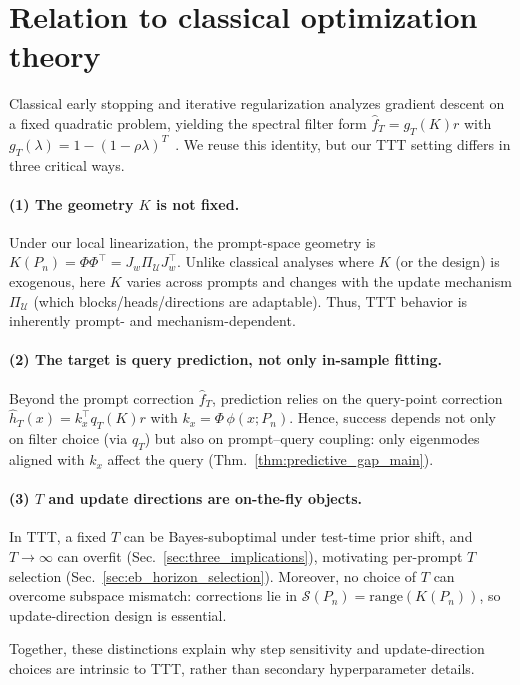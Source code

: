 \documentclass{article}
\theoremstyle{plain}
\theoremstyle{definition}
\theoremstyle{remark}
\begin{document}
\section{Relation to classical optimization theory}
\label{app:early_stopping_relation}
Classical early stopping and iterative regularization analyzes gradient descent on a fixed quadratic problem, yielding the spectral filter form $\hat f_T=g_T(K)r$ with $g_T(\lambda)=1-(1-\rho\lambda)^T$~\citet[e.g.,][]{YaoRosascoCaponnetto2007EarlyStopping,engl1996regularization}. We reuse this identity, but our TTT setting differs in three critical ways.

\paragraph{(1) The geometry $K$ is not fixed.}
Under our local linearization, the prompt-space geometry is
$K(P_n)=\Phi\Phi^\top=J_w\Pi_{\mathcal U}J_w^\top$.
Unlike classical analyses where $K$ (or the design) is exogenous, here $K$ varies across prompts and changes with the update mechanism $\Pi_{\mathcal U}$ (which blocks/heads/directions are adaptable). Thus, TTT behavior is inherently prompt- and mechanism-dependent.

\paragraph{(2) The target is query prediction, not only in-sample fitting.}
Beyond the prompt correction $\hat f_T$, prediction relies on the query-point correction
$\hat h_T(x)=k_x^\top q_T(K)r$ with $k_x=\Phi\,\phi(x;P_n)$.
Hence, success depends not only on filter choice (via $q_T$) but also on prompt--query coupling: only eigenmodes aligned with $k_x$ affect the query (Thm.~\ref{thm:predictive_gap_main}).

\paragraph{(3) $T$ and update directions are on-the-fly objects.}
In TTT, a fixed $T$ can be Bayes-suboptimal under test-time prior shift, and $T\!\to\!\infty$ can overfit (Sec.~\ref{sec:three_implications}), motivating per-prompt $T$ selection (Sec.~\ref{sec:eb_horizon_selection}).
Moreover, no choice of $T$ can overcome subspace mismatch: corrections lie in $\mathcal S(P_n)=\mathrm{range}(K(P_n))$, so update-direction design is essential.


Together, these distinctions explain why step sensitivity and update-direction choices are intrinsic to TTT, rather than secondary hyperparameter details.
\end{document}
